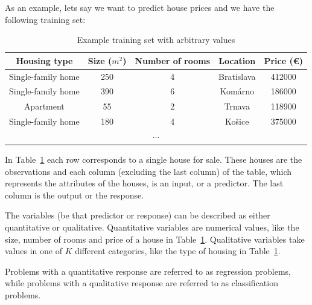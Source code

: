 \documentclass[a4paper,oneside,onecolumn,12pt]{book}
\begin{document}
		As an example, lets say we want to predict house prices and we have the following training set:
		\begin{table}[H]
		\begin{center}
		\begin{tabular}{|c|c|c|c||c|}
			\hline
			\textbf{Housing type} & \textbf{Size ($m^2$)} & \textbf{Number of rooms} & \textbf{Location} & \textbf{Price (€)}\\
			\hline
			Single-family home & 250 & 4 & Bratislava & 412000\\
			\hline
			Single-family home & 390 & 6 & Komárno & 186000\\ 
			\hline
			Apartment & 55 & 2 & Trnava & 118900\\
			\hline
			Single-family home & 180 & 4 & Košice & 375000\\
			\hline
			\multicolumn{5}{|c|}{$\cdots$} \\
			\hline
		\end{tabular}
		\end{center}
		\caption{Example training set with arbitrary values}
		\label{table:example_train_set}
		\end{table}
		In Table~\ref{table:example_train_set} each row corresponds to a single house for sale. These houses are the observations and each column (excluding the last column) of the table, which represents the attributes of the houses, is an input, or a predictor. The last column is the output or the response.

		The variables (be that predictor or response) can be described as either quantitative or qualitative. Quantitative variables are numerical values, like the size, number of rooms and price of a house in Table~\ref{table:example_train_set}. Qualitative variables take values in one of $K$ different categories, like the type of housing in Table~\ref{table:example_train_set}. 
		
		Problems with a quantitative response are referred to as regression problems, while problems with a qualitative response are referred to as classification problems. \cite{AISL}
\end{document}
